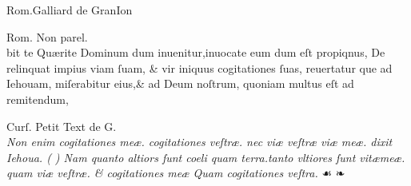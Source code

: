 \documentclass{article}
\begin{document}
\vspace{-3.5\baselineskip}
\setlength{\columnsep}{3mm}
\begin{multicols}{4}
	\tiny
	\centering
	Rom.Galliard de GranIon\\
	\vspace{\baselineskip}
	\fontsize{4}{4.5}\selectfont
	\justifying
	\noindent {}

	\columnbreak

	\centering
	\tiny
	Rom. Non parel.\\
	\vspace{\baselineskip}
	\fontsize{3}{3}\selectfont
	\justifying
	\noindent bit te Qu\ae{}rite Dominum dum inuenitur,inuocate eum dum eſt propiqnus,\linebreak%
	De relinquat impius viam ſuam, \& vir iniquus cogitationes ſuas, reuertatur\linebreak%
	que ad Iehouam, miſerabitur eius,\& ad Deum noſtrum, quoniam multus eſt\linebreak%
	ad remitendum,
	\columnbreak

	\centering
	\tiny
	Curſ. Petit Text de G.\\
	\vspace{\baselineskip}
	\fontsize{4}{4.5}\selectfont
	\justifying
	\noindent \textit{Non enim cogitationes me\ae{}. cogitationes veſtr\ae{}. nec vi\ae{} veſtr\ae{} viæ \linebreak
		me\ae{}. dixit Iehoua. ( {\grecs {}\selectfont{}} ) Nam quanto altiors ſunt coeli quam\linebreak
		terra.tanto vltiores ſunt vit\ae{}me\ae{}. quam vi\ae{} veſtr\ae{}. \& cogitationes\linebreak
		me\ae{} Quam {\normalfont cogitationes} veſtra.} \quad ☙ ❧


\end{multicols}
\end{document}
